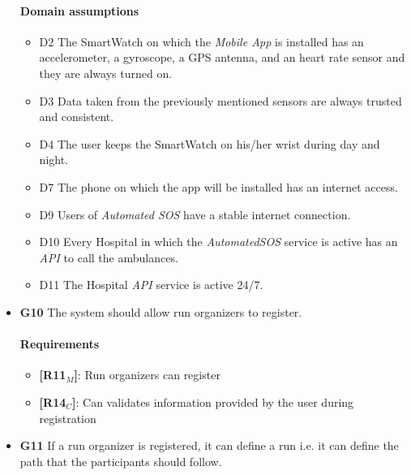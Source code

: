\begin{itemize}
\begin{itemize}
   \end{itemize}
   \paragraph{Domain assumptions}
   \begin{itemize}
    \item  D2  The SmartWatch on which the \textit{Mobile App} is installed has an accelerometer, a gyroscope, a GPS antenna, and an heart rate sensor and they are always turned on.
    
     \item  D3  Data taken from the previously mentioned sensors are always trusted and consistent.
            
     \item  D4  The user keeps the SmartWatch on his/her wrist during day and night.
    
     \item  D7  The phone on which the app will be installed has an internet access.
     
    \item  D9  Users of \textit{Automated SOS} have a stable internet connection.
    
    \item  D10  Every Hospital in which the \textit{AutomatedSOS} service is active has an \textit{API} to call the ambulances.
    
    \item  D11  The Hospital \textit{API} service is active 24/7.
   \end{itemize}
   
   
    \item \textbf{G10} The system should allow run organizers to register.
    \paragraph{Requirements}
   \begin{itemize}
    \item \textbf{[R11$_M$]}: Run organizers can register
    \item \textbf{[R14$_C$]}: Can validates information provided by the user during registration
   \end{itemize}
    
    
    \item \textbf{G11} If a run organizer is registered, it can define a run i.e. it can define the path that the participants should follow.

\end{itemize}
